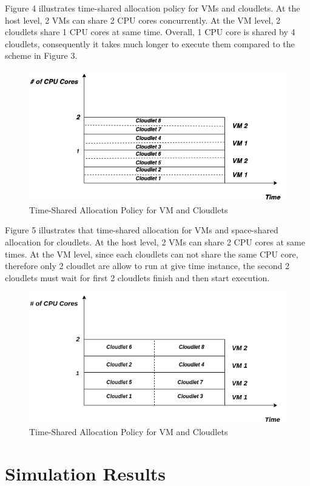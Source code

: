 \documentclass[12pt]{article}
\begin{document}
\indent Figure 4 illustrates time-shared allocation policy for VMs and cloudlets. At the host level,  2 VMs can share 2 CPU cores concurrently. At the VM level,  2 cloudlets share 1 CPU cores at same time. Overall, 1 CPU core is shared by 4  cloudlets, consequently it takes much longer to execute them compared to the scheme in Figure 3.

\begin{figure}[ht!]
\centering
\includegraphics[scale=0.4]{time_vm_time_cloudlet.png}
\caption{Time-Shared Allocation Policy for VM and Cloudlets}
\end{figure}

\indent Figure 5  illustrates that  time-shared allocation for VMs and space-shared allocation for cloudlets.  At the host level,  2 VMs can share 2 CPU cores at same times. At the VM level, since each cloudlets can not share the same CPU core, therefore only 2 cloudlet are allow to run at give time instance, the second 2 cloudlets must wait for first 2 cloudlets finish and then start execution. 

\begin{figure}[ht!]
\centering
\includegraphics[scale=0.4]{time_vm_space_cloudlet.png}
\caption{Time-Shared Allocation Policy for VM and Cloudlets}
\end{figure}

\section{Simulation Results }

\newpage


\end{document}
